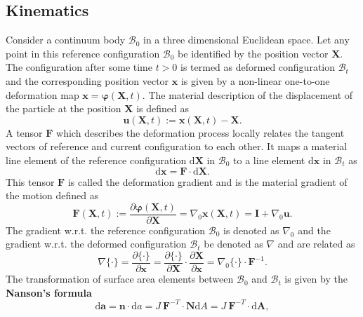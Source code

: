 \documentclass[11pt,a4paper,final]{article}
\begin{document}
\subsection{Kinematics}
Consider a continuum body $\mathcal{B}_0$ in a three dimensional Euclidean space. Let any point in this reference configuration $\mathcal{B}_0$ be identified by the position vector $\mathbf{X}$. The configuration after some time $t > 0$ is termed as deformed configuration $\mathcal{B}_t$ and the corresponding position vector $\mathbf{x}$ is given by a non-linear one-to-one deformation map $\mathbf{x} = \bm{\varphi} (\mathbf{X}, t)$. The material description of the displacement of the particle at the position $\mathbf{X}$ is defined as
\begin{equation}
\mathbf{u}(\mathbf{X}, t) := \mathbf{x}(\mathbf{X}, t) - \mathbf{X}.
\end{equation}
A tensor $\mathbf{F}$ which describes the deformation process locally relates the tangent vectors of reference and current configuration to each other. It maps a material line element of the reference configuration $\bm{\mathrm{d}}\mathbf{X}$ in $\mathcal{B}_0$ to a line element $\bm{\mathrm{d}\mathbf{x}}$ in $\mathcal{B}_t$ as 
\begin{equation}
\bm{\mathrm{d}\mathbf{x}} = \mathbf{F} \cdot \bm{\mathrm{d}\mathbf{X}}.
\end{equation} 
This tensor $\mathbf{F}$ is called the deformation gradient and is the material gradient of the motion defined as
\begin{equation}
\mathbf{F}(\mathbf{X}, t) := \dfrac{\partial \bm{\varphi}(\mathbf{X}, t)}{\partial \mathbf{X}} = \nabla_0 \mathbf{x}(\mathbf{X}, t) = \mathbf{I} + \nabla_0 \mathbf{u}.
\label{eq:1.3}
\end{equation}
The gradient w.r.t. the reference configuration $\mathcal{B}_0$ is denoted as $\nabla_0$ and the gradient w.r.t. the deformed configuration $\mathcal{B}_t$ be denoted as $\nabla$ and are related as 
\begin{equation}
\nabla \{ \cdot \} = \dfrac{\partial \{ \cdot \} }{\partial \mathbf{x}} = \dfrac{\partial \{ \cdot \} }{\partial \mathbf{X}} \cdot \dfrac{\partial \mathbf{X}}{\partial \mathbf{x}} = \nabla_0 \{ \cdot \} \cdot \mathbf{F}^{-1}.
\end{equation} 
The transformation of surface area elements between $\mathcal{B}_0$ and $\mathcal{B}_t$ is given by the \textbf{Nanson's formula}
\begin{equation}
\bm{\mathrm{d}}\mathbf{a} = \mathbf{n} \cdot \mathrm{d}a = J \ \mathbf{F}^{-T} \cdot \mathbf{N} \mathrm{d}A = J \ \mathbf{F}^{-T} \cdot \bm{\mathrm{d}}\mathbf{A},
\end{equation}
\end{document}
